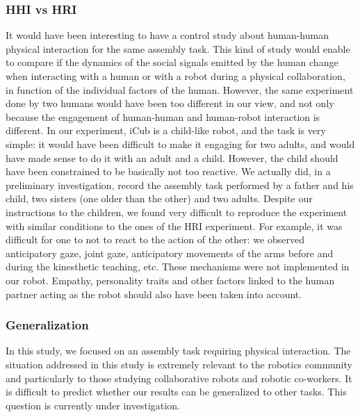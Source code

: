 \documentclass[twocolumn]{svjour3}          %
\begin{document}
\subsubsection{HHI vs HRI}

It would have been interesting to have a control study about human-human physical interaction for the same assembly task. This kind of study would enable to compare if the dynamics of the social signals emitted by the human change when interacting with a human or with a robot during a physical collaboration, in function of the individual factors of the human. 
However, the same experiment done by two humans would have been too different in our view, and not only because the engagement of human-human and human-robot interaction is different.
In our experiment, iCub is a child-like robot, and the task is very simple: it would have been difficult to make it engaging for two adults, and would have made sense to do it with an adult and a child. However, the child should have been constrained to be basically not too reactive. 
We actually did, in a preliminary investigation, record the assembly task performed by a father and his child, two sisters (one older than the other) and two adults. Despite our instructions to the children, we found very difficult to reproduce the experiment with similar conditions to the ones of the HRI experiment. 
For example, 
it was difficult for one to not to react to the action of the other:
we observed anticipatory gaze, joint gaze, anticipatory movements of the arms before and during the kinesthetic teaching, etc. These mechanisms were not implemented in our robot. Empathy, personality traits and other factors linked to the human partner acting as the robot should also have been taken into account.


\subsubsection{Generalization}

In this study, we focused on an assembly task requiring physical interaction. The situation addressed in this study is extremely relevant to the robotics community and particularly to those studying collaborative robots and robotic co-workers. It is difficult to predict whether our results can be generalized to other tasks. This question is currently under investigation.
\end{document}
